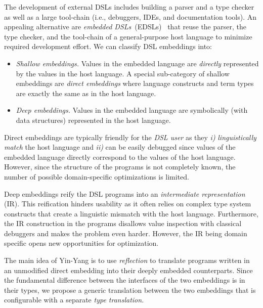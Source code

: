 \documentclass{llncs}
\newcommand{\tool}{Yin-Yang\xspace}
\begin{document}
The development of external DSLs includes building a parser and a type checker as well as a large tool-chain (i.e., debuggers, IDEs, and documentation tools). An appealing alternative are \emph{embedded DSLs}~(EDSLs)~\cite{Hudak96csur} that reuse the parser, the type checker, and the tool-chain of a general-purpose host language to minimize required development effort. We can classify DSL embeddings into:

\begin{itemize}

\item \emph{Shallow embeddings.} Values in the embedded language are \emph{directly} represented by the values in the host language. A special sub-category of shallow embeddings are \emph{direct embeddings} where language constructs and term types are exactly the same as in the host language.

\item \emph{Deep embeddings.}  Values in the embedded language are symbolically (with data structures) represented in the host language.

\end{itemize}

Direct embeddings are typically friendly for the \emph{DSL user} as they \emph{i)} \emph{linguistically match} the host language and \emph{ii)} can be easily debugged since values of the embedded language directly correspond to the values of the host language. However, since the structure of the programs is not completely known, the number of possible domain-specific optimizations is limited.

Deep embeddings reify the DSL programs into an \emph{intermediate representation} (IR). This reification hinders usability as it often relies on complex type system constructs that create a linguistic mismatch with the host language. Furthermore, the IR construction in the programs disallows value inspection with classical debuggers and makes the problem even harder. However, the IR being domain specific opens new opportunities for optimization.


The main idea of \tool is to use \emph{reflection} to translate programs
written in an unmodified direct embedding into their deeply embedded
counterparts.  Since the fundamental difference between the interfaces of the
two embeddings is in their types, we propose a generic translation between
the two embeddings that is configurable with a separate \emph{type
translation}.
\end{document}
